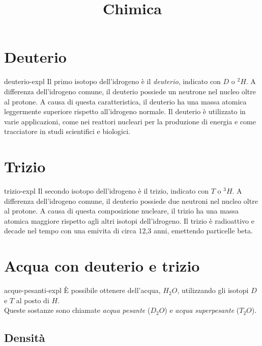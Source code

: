 \documentclass[preview]{standalone}
\begin{document}
\title{Chimica}
\genpage

\section{Deuterio}

\begin{snippet}{deuterio-expl}
Il primo isotopo dell'idrogeno è il \textit{deuterio}, indicato con \(D\) o \(^2H\).
A differenza dell'idrogeno comune, il deuterio possiede un neutrone nel nucleo oltre al protone.
A causa di questa caratteristica, il deuterio ha una massa atomica leggermente superiore rispetto all'idrogeno normale.
Il deuterio è utilizzato in varie applicazioni, come nei reattori nucleari per la produzione di energia e come tracciatore in studi scientifici e biologici. 
\end{snippet}

\section{Trizio}

\begin{snippet}{trizio-expl}
Il secondo isotopo dell'idrogeno è il trizio, indicato con \(T\) o \(^3H\).
A differenza dell'idrogeno comune, il deuterio possiede due neutroni nel nucleo oltre al protone.
A causa di questa composizione nucleare, il trizio ha una massa atomica maggiore rispetto agli altri isotopi dell'idrogeno.
Il trizio è radioattivo e decade nel tempo con una emivita di circa 12,3 anni, emettendo particelle beta.
\end{snippet}

\section{Acqua con deuterio e trizio}

\begin{snippet}{acque-pesanti-expl}
È possibile ottenere dell'acqua, \(H_2O\), utilizzando gli isotopi \(D\) e \(T\) al posto di \(H\).
\\
Queste sostanze sono chiamate \textit{acqua pesante} (\(D_2O\)) e
\textit{acqua superpesante} (\(T_2O\)).
\end{snippet}

\subsection{Densità}
\end{document}

